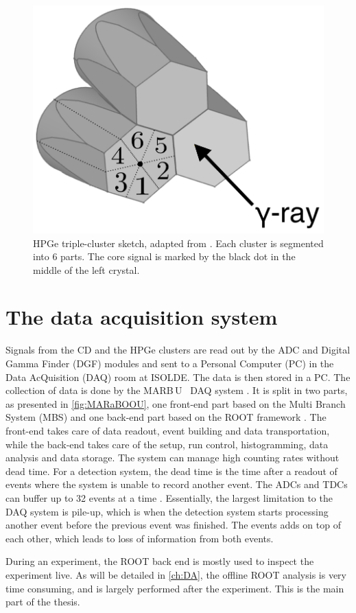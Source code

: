\documentclass[twoside,english]{uiofysmaster/uiofysmaster}
\newcommand{\MBOU}{MAR\belowbaseline[-2pt]{a}B\stackinset{l}{3pt}{b}{-3pt}{O}{O}\,U}
\let\orgautoref\autoref
\renewcommand{\autoref}
        {%
		 \def\subsectionautorefname{Section}%
		 \def\subsubsectionautorefname{Section}%
          \orgautoref}
\begin{document}
\begin{figure}[ht]
	\centering
	\includegraphics[width=0.4\linewidth]{Images/HPGe.png}
	\caption{HPGe triple-cluster sketch, adapted from \cite{Rosiak}. Each cluster is segmented into 6 parts. The core signal is marked by the black dot in the middle of the left crystal.}
	\label{fig:HPGe}
\end{figure}


\section{The data acquisition system}
Signals from the CD and the HPGe clusters are read out by the ADC and Digital Gamma Finder (DGF) modules and sent to a Personal Computer (PC) in the Data AcQuisition (DAQ) room at ISOLDE. 
The data is then stored in a PC. 
The collection of data is done by the \MBOU\ \cite{Maraboou} DAQ system \cite{MB-spect}. 
It is split in two parts, as presented in \autoref{fig:MARaBOOU}, one front-end part based on the Multi Branch System (MBS) \cite{MBS} and one back-end part based on the ROOT framework \cite{ROOT}.
The front-end takes care of data readout, event building and data transportation, while the back-end takes care of the setup, run control, histogramming, data analysis and data storage. 
The system can manage high counting rates without dead time. 
For a detection system, the dead time is the time after a readout of events where the system is unable to record another event. 
The ADCs and TDCs can buffer up to 32 events at a time \cite{MB-spect}. 
Essentially, the largest limitation to the DAQ system is pile-up, which is when the detection system starts processing another event before the previous event was finished. 
The events adds on top of each other, which leads to loss of information from both events.

During an experiment, the ROOT back end is mostly used to inspect the experiment live. 
As will be detailed in \autoref{ch:DA}, the offline ROOT analysis is very time consuming, and is largely performed after the experiment. 
This is the main part of the thesis.
\end{document}
